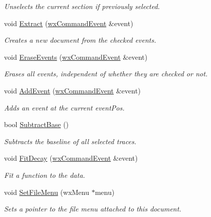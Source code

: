 \begin{DoxyCompactItemize}
\begin{DoxyCompactList}\small\item\em Unselects the current section if previously selected. \item\end{DoxyCompactList}\item 
void \hyperlink{classwxStfDoc_ad46aafbc7c933ae72da528915a43f449}{Extract} (\hyperlink{classwxCommandEvent}{wxCommandEvent} \&event)
\begin{DoxyCompactList}\small\item\em Creates a new document from the checked events. \item\end{DoxyCompactList}\item 
void \hyperlink{classwxStfDoc_ae97d84b92aaf67309f514d1e8e9c739c}{EraseEvents} (\hyperlink{classwxCommandEvent}{wxCommandEvent} \&event)
\begin{DoxyCompactList}\small\item\em Erases all events, independent of whether they are checked or not. \item\end{DoxyCompactList}\item 
void \hyperlink{classwxStfDoc_a8be8771a4348f17969b786fa88884723}{AddEvent} (\hyperlink{classwxCommandEvent}{wxCommandEvent} \&event)
\begin{DoxyCompactList}\small\item\em Adds an event at the current eventPos. \item\end{DoxyCompactList}\item 
bool \hyperlink{classwxStfDoc_a3c758286d53c9d2a2f4db8eb11128cc7}{SubtractBase} ()
\begin{DoxyCompactList}\small\item\em Subtracts the baseline of all selected traces. \item\end{DoxyCompactList}\item 
void \hyperlink{classwxStfDoc_a0e36306341c1684f9691a05cbd2b8825}{FitDecay} (\hyperlink{classwxCommandEvent}{wxCommandEvent} \&event)
\begin{DoxyCompactList}\small\item\em Fit a function to the data. \item\end{DoxyCompactList}\item 
void \hyperlink{classwxStfDoc_a98616f1e6ced3992ba32a9080c86060a}{SetFileMenu} (wxMenu $\ast$menu)
\begin{DoxyCompactList}\small\item\em Sets a pointer to the file menu attached to this document. \item\end{DoxyCompactList}\end{DoxyCompactItemize}


